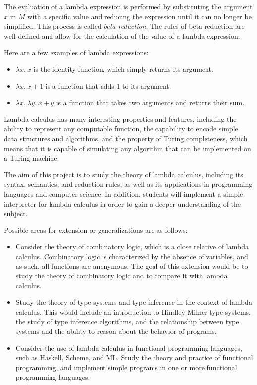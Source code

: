 \documentclass{article}
\begin{document}
\vspace{3mm}
The evaluation of a lambda expression is performed by substituting the argument $x$ in $M$ with a specific value and reducing the expression until it can no longer be simplified. This process is called \textit{beta reduction}. The rules of beta reduction are well-defined and allow for the calculation of the value of a lambda expression.

\vspace{3mm}
Here are a few examples of lambda expressions:

\begin{itemize}
\item $\lambda x.\ x$ is the identity function, which simply returns its argument.
\item $\lambda x.\ x + 1$ is a function that adds 1 to its argument.
\item $\lambda x.\ \lambda y.\ x + y$ is a function that takes two arguments and returns their sum.
\end{itemize}

\vspace{3mm}
Lambda calculus has many interesting properties and features, including the ability to represent any computable function, the capability to encode simple data structures and algorithms, and the property of Turing completeness, which means that it is capable of simulating any algorithm that can be implemented on a Turing machine.

\vspace{3mm}
The aim of this project is to study the theory of lambda calculus, including its syntax, semantics, and reduction rules, as well as its applications in programming languages and computer science. In addition, students will implement a simple interpreter for lambda calculus in order to gain a deeper understanding of the subject.

\vspace{3mm}
Possible areas for extension or generalizations are as follows:
\begin{itemize}
\item Consider the theory of combinatory logic, which is a close relative of lambda calculus. Combinatory logic is characterized by the absence of variables, and as such, all functions are anonymous. The goal of this extension would be to study the theory of combinatory logic and to compare it with lambda calculus.
\item Study the theory of type systems and type inference in the context of lambda calculus. This would include an introduction to Hindley-Milner type systems, the study of type inference algorithms, and the relationship between type systems and the ability to reason about the behavior of programs.
\item Consider the use of lambda calculus in functional programming languages, such as Haskell, Scheme, and ML. Study the theory and practice of functional programming, and implement simple programs in one or more functional programming languages.
\end{itemize}
\end{document}
